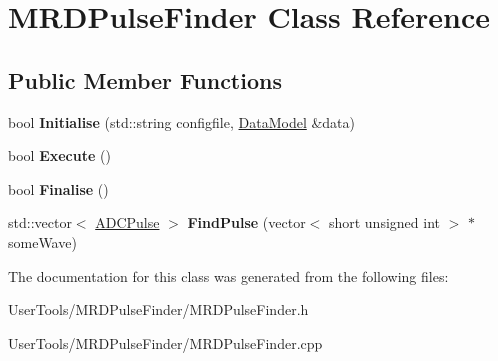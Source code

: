\hypertarget{classMRDPulseFinder}{
\section{MRDPulseFinder Class Reference}
\label{classMRDPulseFinder}
}
\subsection*{Public Member Functions}
\begin{DoxyCompactItemize}
\item 
\hypertarget{classMRDPulseFinder_ad64f6c541f6d5cc2cb1036a9249837c5}{
bool {\bfseries Initialise} (std::string configfile, \hyperlink{classDataModel}{DataModel} \&data)}
\label{classMRDPulseFinder_ad64f6c541f6d5cc2cb1036a9249837c5}

\item 
\hypertarget{classMRDPulseFinder_adff581ca17c601b5ec24a96ad6b85941}{
bool {\bfseries Execute} ()}
\label{classMRDPulseFinder_adff581ca17c601b5ec24a96ad6b85941}

\item 
\hypertarget{classMRDPulseFinder_a492f228151d4af0a6f07e21ff7e732b0}{
bool {\bfseries Finalise} ()}
\label{classMRDPulseFinder_a492f228151d4af0a6f07e21ff7e732b0}

\item 
\hypertarget{classMRDPulseFinder_ab82aeb6cbc87a8d0f88252335f261d33}{
std::vector$<$ \hyperlink{classADCPulse}{ADCPulse} $>$ {\bfseries FindPulse} (vector$<$ short unsigned int $>$ $\ast$someWave)}
\label{classMRDPulseFinder_ab82aeb6cbc87a8d0f88252335f261d33}

\end{DoxyCompactItemize}


The documentation for this class was generated from the following files:\begin{DoxyCompactItemize}
\item 
UserTools/MRDPulseFinder/MRDPulseFinder.h\item 
UserTools/MRDPulseFinder/MRDPulseFinder.cpp\end{DoxyCompactItemize}
